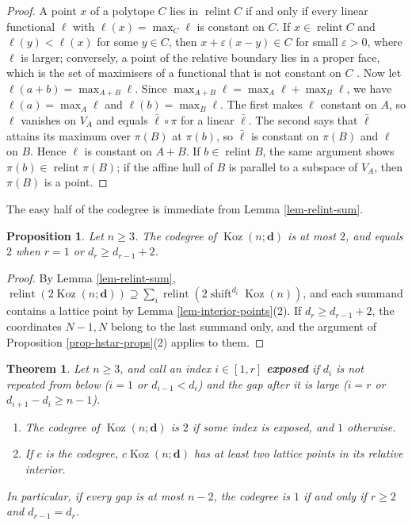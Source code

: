\documentclass[11pt, a4paper, abstract=yes]{scrartcl}
\theoremstyle{definition}
\theoremstyle{remark}
\theoremstyle{plain}
\newtheorem{proposition}[definition]{Proposition}
\newtheorem{theorem}[definition]{Theorem}
\newcommand{\vek}[1]{\boldsymbol{#1}}
\theoremstyle{remark}
\theoremstyle{plain}
\newcommand{\Koz}{\operatorname{Koz}}
\newcommand{\shift}{\operatorname{shift}}
\newcommand{\relint}{\operatorname{relint}}
\newcommand{\leannone}{\tikz[baseline=-0.6ex]\draw[leannone,line width=0.6pt] (0,0) circle (0.55ex);}
\newcommand{\leanmark}[1]{\leavevmode{\reversemarginpar\marginnote{\raggedleft#1}}}
\let\autocite\cite
\begin{document}
\begin{proof}
A point \(x\) of a polytope \(C\) lies in \(\relint C\) if and only if every linear functional \(\ell\) with
\(\ell(x)=\max_C\ell\) is constant on \(C\). If \(x\in\relint C\) and \(\ell(y)<\ell(x)\) for some \(y\in C\),
then \(x+\varepsilon(x-y)\in C\) for small \(\varepsilon>0\), where \(\ell\) is larger; conversely, a point of
the relative boundary lies in a proper face, which is the set of maximisers of a functional that is
not constant on \(C\) \autocite[Chapter 2]{Ziegler1995}. Now let \(\ell(a+b)=\max_{A+B}\ell\). Since
\(\max_{A+B}\ell=\max_A\ell+\max_B\ell\), we have \(\ell(a)=\max_A\ell\) and \(\ell(b)=\max_B\ell\). The first
makes \(\ell\) constant on \(A\), so \(\ell\) vanishes on \(V_A\) and equals \(\bar\ell\circ\pi\) for a linear
\(\bar\ell\). The second says that \(\bar\ell\) attains its maximum over \(\pi(B)\) at \(\pi(b)\), so
\(\bar\ell\) is constant on \(\pi(B)\) and \(\ell\) on \(B\). Hence \(\ell\) is constant on \(A+B\). If
\(b\in\relint B\), the same argument shows \(\pi(b)\in\relint\pi(B)\); if the affine hull of \(B\) is
parallel to a subspace of \(V_A\), then \(\pi(B)\) is a point.
\end{proof}

The easy half of the codegree is immediate from Lemma \ref{lem-relint-sum}.

\begin{proposition}
\leanmark{\leannone}Let \(n\ge3\). The codegree of \(\Koz(n;\vek d)\) is at most \(2\), and equals \(2\) when \(r=1\) or
\(d_r\ge d_{r-1}+2\).
\label{prop-codegree}
\end{proposition}

\begin{proof}
By Lemma \ref{lem-relint-sum}, \(\relint(2\Koz(n;\vek d))\supseteq\sum_i\relint(2\shift^{d_i}\Koz(n))\), and
each summand contains a lattice point by Lemma \ref{lem-interior-points}(2). If \(d_r\ge d_{r-1}+2\), the coordinates \(N-1,N\) belong
to the last summand only, and the argument of Proposition \ref{prop-hstar-props}(2) applies to them.
\end{proof}

\begin{theorem}
\leanmark{\leannone}Let \(n\ge3\), and call an index \(i\in[1,r]\) \textbf{exposed} if \(d_i\) is not repeated from below
(\(i=1\) or \(d_{i-1}<d_i\)) and the gap after it is large (\(i=r\) or \(d_{i+1}-d_i\ge n-1\)).
\begin{enumerate}
\item The codegree of \(\Koz(n;\vek d)\) is \(2\) if some index is exposed, and \(1\) otherwise.
\item If \(c\) is the codegree, \(c\Koz(n;\vek d)\) has at least two lattice points in its relative
interior.
\end{enumerate}
In particular, if every gap is at most \(n-2\), the codegree is \(1\) if and only if \(r\ge2\) and
\(d_{r-1}=d_r\).
\label{thm-codegree}
\end{theorem}
\end{document}
